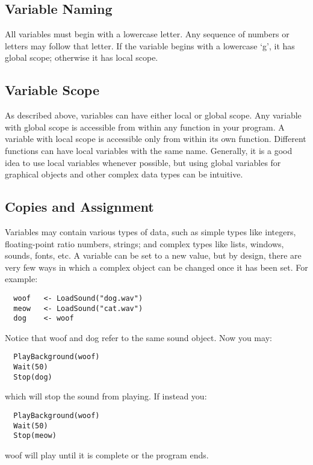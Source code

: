 \subsection{Variable Naming}

All variables must begin with a lowercase letter. Any sequence of numbers or letters may follow that letter. If the variable begins with a lowercase `g', it has global scope; otherwise it has local scope.

\subsection{Variable Scope}

As described above, variables can have either local or  
global scope.  Any variable with global scope is accessible
from within any function in your program.  A variable with local
scope is accessible only from within its own function.  Different functions can have local variables with
the same name. Generally, it is a good idea  to use local
variables whenever possible, but using global variables for graphical
objects and other complex data types can be intuitive.

\subsection{Copies and Assignment}
\label{sec:copies_and_ass}

Variables may contain various types of data, such as simple types like integers, floating-point ratio numbers, strings; and complex types like lists, windows, sounds, fonts, etc. A variable can be set to a new value, but by design, there are very few ways in which a complex object can be changed once it has been set. For example:
\begin{verbatim}
  woof   <- LoadSound("dog.wav")
  meow   <- LoadSound("cat.wav")
  dog    <- woof
\end{verbatim}
Notice that woof and dog refer to the same sound object. Now you may:
\begin{verbatim}
  PlayBackground(woof)
  Wait(50)
  Stop(dog)
\end{verbatim}
which will stop the sound from playing. If instead you:
\begin{verbatim}
  PlayBackground(woof)
  Wait(50)
  Stop(meow)
\end{verbatim}
woof will play until it is complete or the program ends.

